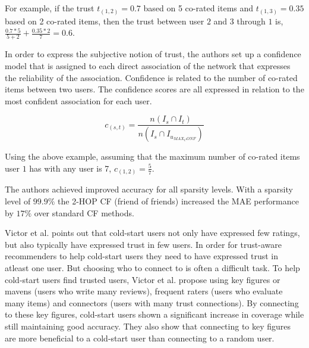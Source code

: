 For example, if the trust $t_{(1,2)} = 0.7$ based on 5 co-rated items
and $t_{(1,3)} = 0.35$ based on 2 co-rated items, then the trust
between user $2$ and $3$ through $1$ is, $\frac{0.7*5}{5+2} + \frac{0.35*2}{7} = 0.6$.

In order to express the subjective notion of trust, the authors set up a
confidence model that is assigned to each direct association of the network
that expresses the reliability of the association. Confidence is related to the
number of co-rated items between two users. The confidence scores are all
expressed in relation to the most confident association for each user.

\begin{equation}
c_{(s,t)} = \frac{n(I_{s} \cap I_{t})}{n(I_{s} \cap I_{u_{MAX_CONF}})}
\end{equation}

Using the above example, assuming that the maximum number of co-rated items
user $1$ has with any user is 7, $c_{(1,2)} = \frac{5}{7}$.

The authors achieved improved accuracy for all sparsity levels. With a sparsity
level of $99.9\%$ the 2-HOP CF (friend of friends) increased the MAE
performance by $17\%$ over standard CF methods.


Victor et al. \cite{Victor2008} points out that cold-start users not only have
expressed few ratings, but also typically have expressed trust in few users. In
order for trust-aware recommenders to help cold-start users they need to have
expressed trust in atleast one user. But choosing who to connect to is often a
difficult task. To help cold-start users find trusted users, Victor et al.
propose using key figures or mavens (users who write many reviews), frequent
raters (users who evaluate many items) and connectors (users with
many trust connections). By connecting to these key figures, cold-start users
shown a significant increase in coverage while still maintaining good accuracy.
They also show that connecting to key figures are more beneficial to a
cold-start user than connecting to a random user.

